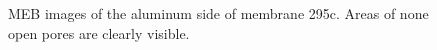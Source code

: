 \documentclass[thesis.tex]{subfiles}
\begin{document}
          \begin{figure}
            \hfill
            \caption{MEB images of the aluminum side of membrane 295c. Areas of none open pores are clearly visible.}
            \label{fig:295c-meb}
          \end{figure}
\end{document}
